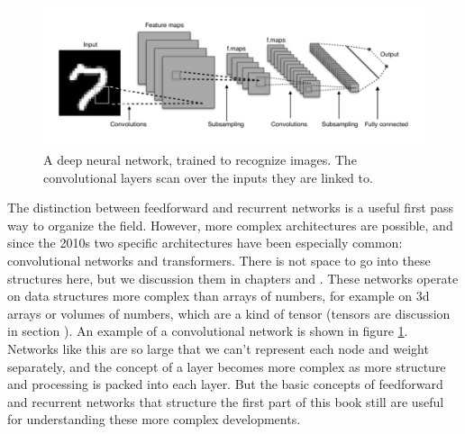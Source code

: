 \begin{figure}[h]
\centering
\includegraphics[scale=.45]{./images/deepNet.png}
\caption[Adapted from a creative commons image by Aphex34 at \url{https://commons.wikimedia.org/wiki/File:Typical_cnn.png} ]{A deep neural network, trained to recognize images. The convolutional layers scan over the inputs they are linked to. }
\label{deep_net}
\end{figure}


The distinction between feedforward and recurrent networks is a useful first pass way to organize the field. However, more complex architectures are possible, and since the 2010s two specific architectures have been especially common: convolutional networks and transformers.  There is not space to go into these structures here, but we discussion them in chapters  and . These networks operate on data structures more complex than arrays of numbers, for example on 3d arrays or volumes of numbers, which are a kind of tensor (tensors are discussion in section ). An example of a convolutional network is shown in figure \ref{deep_net}. Networks like this are so large that we can't represent each node and weight separately, and the concept of a layer becomes more complex as more structure and processing is packed into each layer. But the basic concepts of feedforward and recurrent networks that structure the first part of this book still are useful for understanding these more complex developments. 

